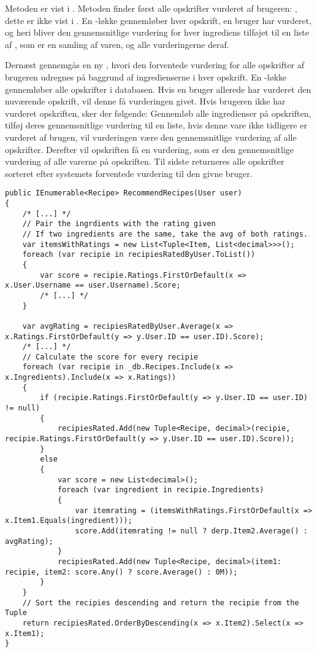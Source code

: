 Metoden  er vist i .
Metoden finder først alle opskrifter vurderet af brugeren: , dette er ikke vist i .
En -løkke gennemløber hver opskrift, en bruger har vurderet, og heri bliver den gennemsnitlige vurdering for hver ingrediens tilføjet til en liste af , som er en samling af varen, og alle vurderingerne deraf. 

Dernæst gennemgås en ny , hvori den forventede vurdering for alle opskrifter af brugeren udregnes på baggrund af ingredienserne i hver opskrift.
En -løkke gennemløber alle opskrifter i databasen. 
Hvis en bruger allerede har vurderet den nuværende opskrift, vil denne få vurderingen givet.
Hvis brugeren ikke har vurderet opskriften, sker der følgende: Gennemløb alle ingredienser på opskriften, tilføj deres gennemsnitlige vurdering til en liste, hvis denne vare ikke tidligere er vurderet af brugen, vil vurderingen være den gennemsnitlige vurdering af alle opskrifter. 
Derefter vil opskriften få en vurdering, som er den gennemsnitlige vurdering af alle varerne på opskriften.
Til sidste returneres alle opskrifter sorteret efter systemets forventede vurdering til den givne bruger.

\begin{lstlisting}[caption={Metoden \class{RecommendRecipes} sorterer opskrifter efter forventede vurdering for en given bruger.}, label=recommendrecipes]
public IEnumerable<Recipe> RecommendRecipes(User user)
{
    /* [...] */
    // Pair the ingrdients with the rating given
    // If two ingredients are the same, take the avg of both ratings.
    var itemsWithRatings = new List<Tuple<Item, List<decimal>>>();
    foreach (var recipie in recipiesRatedByUser.ToList())
    {
        var score = recipie.Ratings.FirstOrDefault(x => x.User.Username == user.Username).Score;
        /* [...] */
    }

    var avgRating = recipiesRatedByUser.Average(x => x.Ratings.FirstOrDefault(y => y.User.ID == user.ID).Score);
    /* [...] */
    // Calculate the score for every recipie
    foreach (var recipie in _db.Recipes.Include(x => x.Ingredients).Include(x => x.Ratings))
    {
        if (recipie.Ratings.FirstOrDefault(y => y.User.ID == user.ID) != null)
        {
            recipiesRated.Add(new Tuple<Recipe, decimal>(recipie, recipie.Ratings.FirstOrDefault(y => y.User.ID == user.ID).Score));
        }
        else
        {
            var score = new List<decimal>();
            foreach (var ingredient in recipie.Ingredients)
            {
                var itemrating = (itemsWithRatings.FirstOrDefault(x => x.Item1.Equals(ingredient)));
                score.Add(itemrating != null ? derp.Item2.Average() : avgRating);
            }
            recipiesRated.Add(new Tuple<Recipe, decimal>(item1: recipie, item2: score.Any() ? score.Average() : 0M));
        }
    }
    // Sort the recipies descending and return the recipie from the Tuple
    return recipiesRated.OrderByDescending(x => x.Item2).Select(x => x.Item1);
}
\end{lstlisting}

